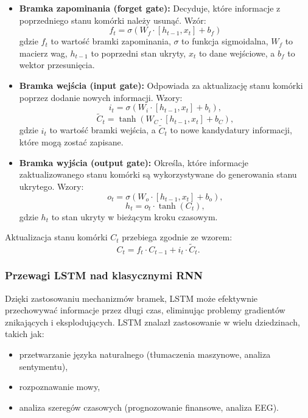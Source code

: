 \documentclass[eeg_v4.tex]{subfiles}
\begin{document}
    \begin{itemize}
        \item \textbf{Bramka zapominania (forget gate):}
        Decyduje, które informacje z poprzedniego stanu komórki należy usunąć. Wzór:
        \[
            f_t = \sigma(W_f \cdot [h_{t-1}, x_t] + b_f)
        \]
        gdzie \( f_t \) to wartość bramki zapominania, \( \sigma \) to funkcja sigmoidalna, \( W_f \) to macierz wag,
        \( h_{t-1} \) to poprzedni stan ukryty, \( x_t \) to dane wejściowe, a \( b_f \) to wektor przesunięcia.

        \item \textbf{Bramka wejścia (input gate):}
        Odpowiada za aktualizację stanu komórki poprzez dodanie nowych informacji. Wzory:
        \[
            i_t = \sigma(W_i \cdot [h_{t-1}, x_t] + b_i),
        \]
        \[
            \tilde{C}_t = \tanh(W_C \cdot [h_{t-1}, x_t] + b_C),
        \]
        gdzie \( i_t \) to wartość bramki wejścia, a \( \tilde{C}_t \)
        to nowe kandydatury informacji, które mogą zostać zapisane.

        \item \textbf{Bramka wyjścia (output gate):}
        Określa, które informacje zaktualizowanego stanu komórki są wykorzystywane do generowania stanu ukrytego. Wzory:
        \[
            o_t = \sigma(W_o \cdot [h_{t-1}, x_t] + b_o),
        \]
        \[
            h_t = o_t \cdot \tanh(C_t),
        \]
        gdzie \( h_t \) to stan ukryty w bieżącym kroku czasowym.
    \end{itemize}

    Aktualizacja stanu komórki \( C_t \) przebiega zgodnie ze wzorem:
    \[
        C_t = f_t \cdot C_{t-1} + i_t \cdot \tilde{C}_t.
    \]

    \subsubsection{Przewagi LSTM nad klasycznymi RNN}
    Dzięki zastosowaniu mechanizmów bramek, LSTM może efektywnie przechowywać informacje przez długi czas, eliminując
    problemy gradientów znikających i eksplodujących. LSTM znalazł zastosowanie w wielu dziedzinach, takich jak:
    \begin{itemize}
        \item przetwarzanie języka naturalnego (tłumaczenia maszynowe, analiza sentymentu),
        \item rozpoznawanie mowy,
        \item analiza szeregów czasowych (prognozowanie finansowe, analiza EEG).
    \end{itemize}
\end{document}
